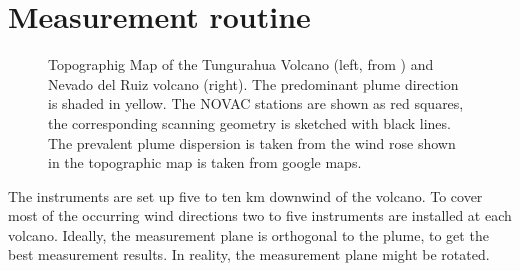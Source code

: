 \section{Measurement routine}
\begin{figure}[h]
	\hspace*{-0.8cm}
	\caption[Topographig Map of the Tungurahua Volcano ( from \cite{hidalgo2015so2}) and Nevado del Ruiz volcano]{Topographig Map of the Tungurahua Volcano (left, from \cite{hidalgo2015so2}) and Nevado del Ruiz volcano (right). The predominant plume direction is shaded in yellow.  The NOVAC stations are shown as red squares, the corresponding scanning geometry is sketched with black lines. The prevalent plume dispersion is taken from the wind rose shown in \citet{Windrose} the topographic map is taken from google maps.}
	\label{fig:maptungurahua2}
\end{figure}

The instruments are set up five to ten km downwind of the volcano. To cover most of the occurring wind directions two to five instruments are installed at each volcano. Ideally, the measurement plane is orthogonal to the plume, to get the best measurement results. In reality, the measurement plane might be rotated.\\

